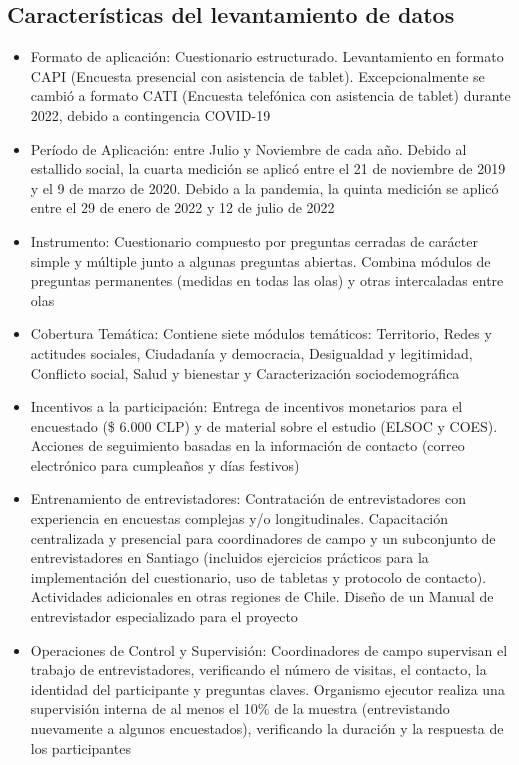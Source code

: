 \documentclass[
  12pt,
]{book}
\begin{document}
\hypertarget{caracteruxedsticas-del-levantamiento-de-datos}{%
\subsection*{Características del levantamiento de datos}\label{caracteruxedsticas-del-levantamiento-de-datos}}

\begin{itemize}
\item
  Formato de aplicación: Cuestionario estructurado. Levantamiento en formato CAPI (Encuesta presencial con asistencia de tablet). Excepcionalmente se cambió a formato CATI (Encuesta telefónica con asistencia de tablet) durante 2022, debido a contingencia COVID-19
\item
  Período de Aplicación: entre Julio y Noviembre de cada año. Debido al estallido social, la cuarta medición se aplicó entre el 21 de noviembre de 2019 y el 9 de marzo de 2020. Debido a la pandemia, la quinta medición se aplicó entre el 29 de enero de 2022 y 12 de julio de 2022
\item
  Instrumento: Cuestionario compuesto por preguntas cerradas de carácter simple y múltiple junto a algunas preguntas abiertas. Combina módulos de preguntas permanentes (medidas en todas las olas) y otras intercaladas entre olas
\item
  Cobertura Temática: Contiene siete módulos temáticos: Territorio, Redes y actitudes sociales, Ciudadanía y democracia, Desigualdad y legitimidad, Conflicto social, Salud y bienestar y Caracterización sociodemográfica
\item
  Incentivos a la participación: Entrega de incentivos monetarios para el encuestado (\$ 6.000 CLP) y de material sobre el estudio (ELSOC y COES). Acciones de seguimiento basadas en la información de contacto (correo electrónico para cumpleaños y días festivos)
\item
  Entrenamiento de entrevistadores: Contratación de entrevistadores con experiencia en encuestas complejas y/o longitudinales. Capacitación centralizada y presencial para coordinadores de campo y un subconjunto de entrevistadores en Santiago (incluidos ejercicios prácticos para la implementación del cuestionario, uso de tabletas y protocolo de contacto). Actividades adicionales en otras regiones de Chile. Diseño de un Manual de entrevistador especializado para el proyecto
\item
  Operaciones de Control y Supervisión: Coordinadores de campo supervisan el trabajo de entrevistadores, verificando el número de visitas, el contacto, la identidad del participante y preguntas claves. Organismo ejecutor realiza una supervisión interna de al menos el 10\% de la muestra (entrevistando nuevamente a algunos encuestados), verificando la duración y la respuesta de los participantes
\end{itemize}
\end{document}
